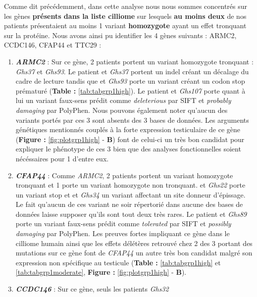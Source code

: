 \documentclass[12pt,twoside]{reedthesis}
\theoremstyle{definition}
\theoremstyle{definition}
\theoremstyle{remark}
\begin{document}
  Comme dit précédemment, dans cette analyse nous nous sommes concentrés
  sur les gènes \textbf{présents dans la liste cilliome} sur lesquels
  \textbf{au moins deux} de nos patients présentaient au moins 1 variant
  \textbf{homozygote} ayant un effet tronquant sur la protéine. Nous avons
  ainsi pu identifier les 4 gènes suivants : ARMC2, CCDC146, CFAP44 et
  TTC29 :
  
  \begin{enumerate}
  \def\labelenumi{\arabic{enumi}.}
  \item
    \textbf{\emph{ARMC2}} : Sur ce gène, 2 patients portent un variant
    homozygote tronquant : \emph{Ghs37} et \emph{Ghs93}. Le patient et
    \emph{Ghs37} portent un indel créant un décalage du cadre de lecture
    tandis que et \emph{Ghs93} porte un variant créant un codon stop
    prématuré (\textbf{Table : }\ref{tab:tabgrp1high}). Le patient et
    \emph{Ghs107} porte quant à lui un variant faux-sens prédit comme
    \emph{deleterious} par SIFT et \emph{probably damaging} par PolyPhen.
    Nous pouvons également noter qu'aucun des variants portés par ces 3
    sont absents des 3 bases de données. Les arguments génétiques
    mentionnés couplés à la forte expression testiculaire de ce gène
    (\textbf{Figure : }\ref{fig:plotgrp1high} - \textbf{B}) font de
    celui-ci un très bon candidat pour expliquer le phénotype de ces 3
    bien que des analyses fonctionnelles soient nécéssaires pour 1 d'entre
    eux.
  \item
    \textbf{\emph{CFAP44}} : Comme \emph{ARMC2}, 2 patients portent un
    variant homozygote tronquant et 1 porte un variant homozygote non
    tronquant. et \emph{Ghs22} porte un variant stop et et \emph{Ghs34} un
    variant affectant un site donneur d'épissage. Le fait qu'aucun de ces
    variant ne soir répertorié dans aucune des bases de données laisse
    supposer qu'ils sont tout deux très rares. Le patient et \emph{Ghs89}
    porte un variant faux-sens prédit comme \emph{tolerated} par SIFT et
    \emph{possibly damaging} par PolyPhen. Les preuves fortes impliquant
    ce gène dans le cilliome humain ainsi que les effets délétères
    retrouvé chez 2 des 3 portant des mutations sur ce gène font de
    \emph{CFAP44} un autre très bon candidat malgré son expression non
    spécifique au testicule (\textbf{Table : }\ref{tab:tabgrp1high} et
    \ref{tab:tabgrp1moderate}, \textbf{Figure : }\ref{fig:plotgrp1high} -
    \textbf{B}).
  \item
    \textbf{\emph{CCDC146}} : Sur ce gène, seuls les patients \emph{Ghs32}

\end{enumerate}
\end{document}
